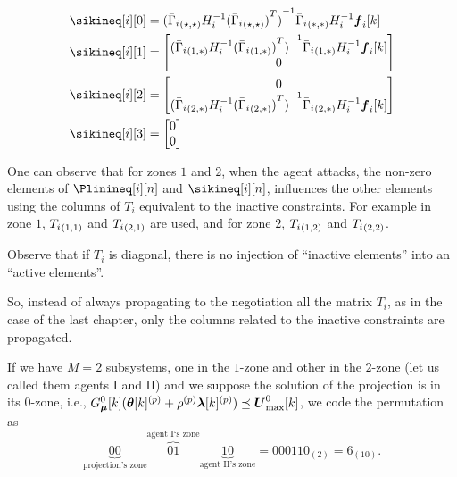 \documentclass[../main.tex]{subfiles}
\begin{document}
\begin{align}
  \sikineq[i][0]&={{(\linearcoefiineqnonzero)}^{-1}}\elem[*,*]{\bar{\Gamma}_{i}}H_{i}^{-1}\vec{f}_{i}[k]\\
  \sikineq[i][1]&= \left[
                  \begin{matrix}
                    {{(\linearcoefiineqnonzero[1,*])}^{-1}}\elem[1,*]{\bar{\Gamma}_{i}}H_{i}^{-1}\vec{f}_{i}[k]\\
                    0
                  \end{matrix}
  \right]\\
  \sikineq[i][2]&=\left[
                  \begin{matrix}
                    0\\
                    {{(\linearcoefiineqnonzero[2,*])}^{-1}}\elem[2,*]{\bar{\Gamma}_{i}}H_{i}^{-1}\vec{f}_{i}[k]\\
                  \end{matrix}
  \right]\\
  \sikineq[i][3]&= \left[
                  \begin{matrix}
                    0\\
                    0
                  \end{matrix}
  \right]
\end{align}

One can observe that for zones $1$ and $2$, when the agent attacks, the non-zero elements of $\Plinineq[i][n]$ and $\sikineq[i][n]$, influences the other elements using the columns of $T_{i}$ equivalent to the inactive constraints.
For example in zone $1$, $\elem[1,1]{T_{i}}$ and $\elem[2,1]{T_{i}}$ are used, and for zone $2$, $\elem[1,2]{T_{i}}$ and $\elem[2,2]{T_{i}}$.
\begin{remark}
  Observe that if $T_{i}$ is diagonal, there is no injection of ``inactive elements'' into an ``active elements''.
\end{remark}

So, instead of always propagating to the negotiation all the matrix $T_{i}$, as in the case of the last chapter, only the columns related to the inactive constraints are propagated.

If we have $M=2$ subsystems, one in the $1$-zone and other in the $2$-zone (let us called them agents I and II) and we suppose the solution of the projection is in its $0$-zone, i.e., ${G_{\vec{\mu}}^{0}[k](\vec{\theta}[k]\p+\rho\p\vec{\lambda}[k]\p) \preceq \vec{U}_{\max}^{0}[k]}$, we code the permutation as
\begin{equation}
  \underbrace{00}_{\text{projection's zone}}\overbrace{01}^{\text{agent I`s zone}}\underbrace{10}_{\text{agent II's zone}} = 000110_{(2)}=6_{(10)}.
\end{equation}
\end{document}
